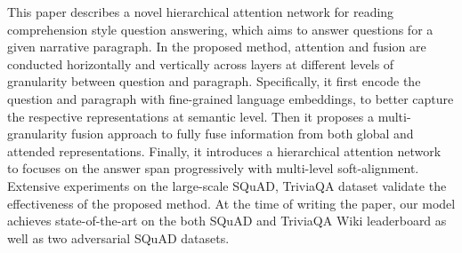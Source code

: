 This paper describes a novel hierarchical attention network for reading comprehension style question answering, which aims to answer questions for a given narrative paragraph. In the proposed method, attention and fusion are conducted horizontally and vertically across layers at different levels of granularity between question and paragraph. Specifically, it first encode the question and paragraph with fine-grained language embeddings, to better capture the respective representations at semantic level. Then it proposes a multi-granularity fusion approach to fully fuse information from both global and attended representations. Finally, it introduces a hierarchical attention network to focuses on the answer span progressively with multi-level soft-alignment. Extensive experiments on the large-scale SQuAD, TriviaQA dataset validate the effectiveness of the proposed method. At the time of writing the paper, our model achieves state-of-the-art on the both SQuAD and TriviaQA Wiki leaderboard as well as two adversarial SQuAD datasets.
